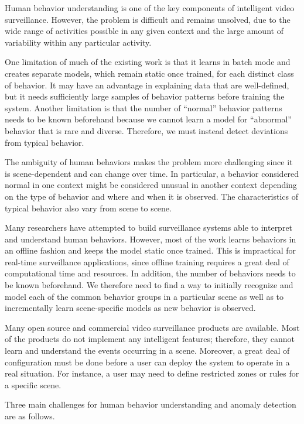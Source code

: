 Human behavior understanding is one of the key components of
intelligent video surveillance. However, the problem is difficult and
remains unsolved, due to the wide range of activities possible in any
given context and the large amount of variability within any
particular activity.

One limitation of much of the existing work is that it learns in batch
mode and creates separate models, which remain static once trained,
for each distinct class of behavior. It may have an advantage in
explaining data that are well-defined, but it needs sufficiently large
samples of behavior patterns before training the system. Another
limitation is that the number of ``normal'' behavior patterns needs to
be known beforehand because we cannot learn a model for ``abnormal''
behavior that is rare and diverse. Therefore, we must instead detect
deviations from typical behavior.

The ambiguity of human behaviors makes the problem more challenging
since it is scene-dependent and can change over time. In particular, a
behavior considered normal in one context might be considered unusual
in another context depending on the type of behavior and where and
when it is observed. The characteristics of typical behavior also vary
from scene to scene.

Many researchers have attempted to build surveillance systems able to
interpret and understand human behaviors. However, most of the work
learns behaviors in an offline fashion and keeps the model static once
trained. This is impractical for real-time surveillance applications,
since offline training requires a great deal of computational time and
resources. In addition, the number of behaviors needs to be known
beforehand. We therefore need to find a way to initially recognize and
model each of the common behavior groups in a particular scene as well
as to incrementally learn scene-specific models as new behavior is
observed.

Many open source and commercial video surveillance products are 
available. Most of the products do not implement any intelligent
features; therefore, they cannot learn and understand the events
occurring in a scene. Moreover, a great deal of configuration must be done
before a user can deploy the system to operate in a real situation.
For instance, a user may need to define restricted zones or rules
for a specific scene.

Three main challenges for human behavior understanding and anomaly
detection are as follows.

